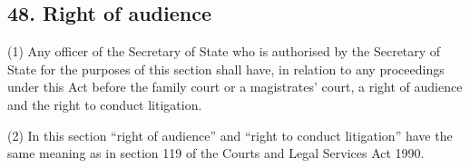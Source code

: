 \documentclass[12pt,a4paper]{article}
\begin{document}
\subsection{48. Right of audience}

(1) Any 
officer of the 
Secretary of State  %
who is authorised  %
by the 
Secretary of State  %
for the purposes of this section shall have, in relation to any proceedings under this Act before 
the family court or  %
a magistrates' court, a right of audience and the right to conduct litigation.

(2) In this section “right of audience” and “right to conduct litigation” have the same meaning as in section 119 of the Courts and Legal Services Act 1990.
\end{document}
